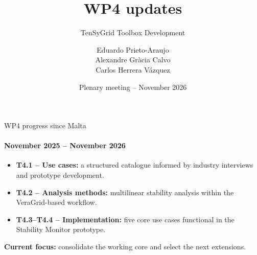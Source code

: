 \documentclass[aspectratio=1609,9pt]{beamer}
\author[UPC -- CITCEA]{\texorpdfstring{Eduardo Prieto-Araujo\\Alexandre Gràcia Calvo\\Carlos Herrera Vázquez}{Eduardo Prieto-Araujo; Alexandre Gràcia Calvo; Carlos Herrera Vázquez}}
\title[WP4 -- TenSyGrid Toolbox]{WP4 updates}
\subtitle{TenSyGrid Toolbox Development}
\date[Nov 2026]{Plenary meeting -- November 2026}
\begin{document}
\begingroup
{}
\begin{frame}
  \titlepage
\end{frame}
\endgroup

\begin{frame}[t]{WP4 progress since Malta}
  \framesubtitle{November 2025 -- November 2026}
  \vspace{1.5ex}
  \begin{itemize}\setlength{\itemsep}{2ex}
    \item \textbf{T4.1 -- Use cases:} a structured catalogue informed by industry interviews and prototype development.
    \item \textbf{T4.2 -- Analysis methods:} multilinear stability analysis within the VeraGrid-based workflow.
    \item \textbf{T4.3--T4.4 -- Implementation:} five core use cases functional in the Stability Monitor prototype.
  \end{itemize}
  \vfill
  {\color{tgpetrol}\textbf{Current focus:} consolidate the working core and select the next extensions.}
\end{frame}
\end{document}
